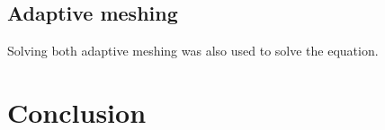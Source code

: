 \documentclass[a4paper, 12pt]{article} %
\begin{document}
\subsection{Adaptive meshing}
Solving both 
adaptive meshing was also used to solve the equation. 

\section{Conclusion}
\end{document}
